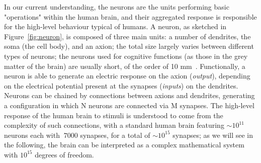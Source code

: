  In our current understanding, the neurons are the units performing basic "operations" within the human brain, and their aggregated response is responsible for the high-level behaviour typical of humans.
 A neuron, as sketched in Figure~\ref{fig:neuron}, is composed of three main units: a number of dendrites, the soma (the cell body), and an axion; the total size largely varies between different types of neurons; the neurons used for cognitive functions (as those in the grey matter of the brain) are usually short, of the order of 10 mm~\cite{neuronlength}.
Functionally, a neuron is able to generate an electric response on the axion (\emph{output}), depending on the electrical potential present at the synapses (\emph{inputs}) on the dendrites. Neurons can be chained by connections between axions and dendrites, generating a configuration in which N neurons are connected via M synapses.
 The high-level response of the human brain to stimuli is understood to come from the complexity of such connections, with a standard human brain featuring $\sim 10^{11}$ neurons each with $~7000$ synapses, for a total of $\sim 10^{15}$ synapses; as we will see in the following, the brain can be interpreted as a complex mathematical system with $10^{15}$ degrees of freedom.


